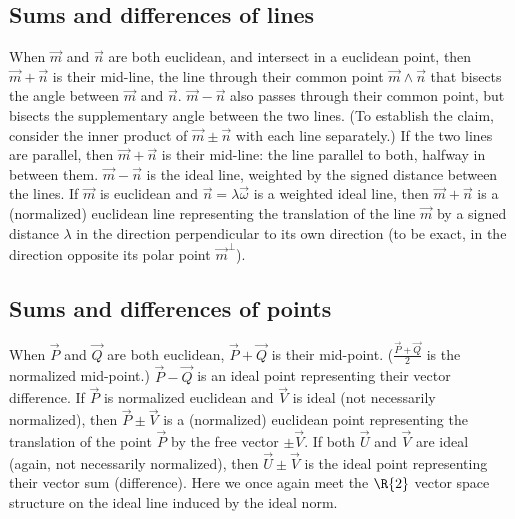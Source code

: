 \documentclass[12pt]{article}
\begin{document}
\subsection{Sums and differences of lines} When $\vec{m}$ and $\vec{n}$ are both  euclidean,  and intersect in a euclidean point, then $\vec{m} + \vec{n}$ is their mid-line, the line through their common point $\vec{m} \wedge \vec{n}$ that bisects the angle between $\vec{m}$ and $\vec{n}$.  $\vec{m} - \vec{n}$  also passes through their common point, but bisects the supplementary angle between the two lines. (To establish the claim, consider the inner product of $\vec{m} \pm \vec{n}$ with each line separately.) If the two lines are parallel, then  $\vec{m} + \vec{n}$ is their mid-line: the line parallel to both, halfway in between them.    $\vec{m} - \vec{n}$ is the ideal line, weighted by the signed distance between the lines. If $\vec{m}$ is euclidean and $\vec{n} = \lambda \vec{\omega}$ is a weighted ideal line, then $\vec{m} + \vec{n}$ is a (normalized) euclidean  line representing the translation of the line $\vec{m}$ by a signed distance $\lambda$ in the direction perpendicular to its own direction (to  be exact, in the direction opposite its polar point $\vec{m}^{\perp}$).  %
 
 \subsection{Sums and differences of points} 
 \label{sec:sumdiffpts}
 When $\vec{P}$ and $\vec{Q}$ are both euclidean, $\vec{P} + \vec{Q}$ is their mid-point.  ($\frac{\vec{P} + \vec{Q}}{2}$ is the normalized mid-point.)  $\vec{P} - \vec{Q}$ is an ideal point representing their vector difference.  If $\vec{P}$ is normalized euclidean and $\vec{V}$ is ideal (not necessarily normalized), then $\vec{P} \pm \vec{V}$ is a (normalized) euclidean  point representing the translation of the point $\vec{P}$ by the free vector $\pm\vec{V}$. If both $\vec{U}$ and $\vec{V}$ are ideal (again, not necessarily normalized), then $\vec{U} \pm \vec{V}$ is the ideal point representing their vector sum (difference).  Here we once again meet the $\R{2}$ vector space structure on the ideal line induced by the ideal norm. %
\end{document}
